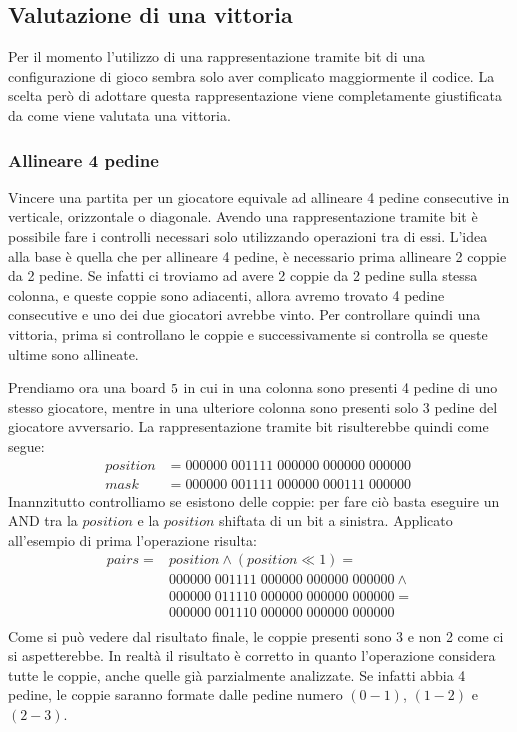 \documentclass[a4paper]{article}
\begin{document}
\subsection{Valutazione di una vittoria}
Per il momento l'utilizzo di una rappresentazione tramite bit di una 
configurazione di gioco sembra solo aver complicato maggiormente il codice. 
La scelta però di adottare questa rappresentazione viene completamente 
giustificata da come viene valutata una vittoria.

\subsubsection{Allineare 4 pedine}
Vincere una partita per un giocatore equivale ad allineare 4 pedine consecutive
in verticale, orizzontale o diagonale. Avendo una rappresentazione tramite bit è
possibile fare i controlli necessari solo utilizzando operazioni tra di essi.
L'idea alla base è quella che per allineare 4 pedine, è necessario prima 
allineare 2 coppie da 2 pedine. Se infatti ci troviamo ad avere 2 coppie da 2
pedine sulla stessa colonna, e queste coppie sono adiacenti, allora avremo 
trovato 4 pedine consecutive e uno dei due giocatori avrebbe vinto. Per 
controllare quindi una vittoria, prima si controllano le coppie e 
successivamente si controlla se queste ultime sono allineate.

Prendiamo ora una board $5 \time 5$ in cui in una colonna sono presenti 4 pedine
di uno stesso giocatore, mentre in una ulteriore colonna sono presenti solo 3
pedine del giocatore avversario. La rappresentazione tramite bit risulterebbe 
quindi come segue:
\begin{align*}
  position &= 000000\; 001111\; 000000\; 000000\; 000000\\
  mask &= 000000\; 001111\; 000000\; 000111\; 000000\;
\end{align*}
Inannzitutto controlliamo se esistono delle coppie: per fare ciò basta eseguire
un AND tra la $position$ e la $position$ shiftata di un bit a sinistra. Applicato
all'esempio di prima l'operazione risulta:
\begin{align*}
  pairs = &position \land (position \ll 1) =\\
  &000000\; 001111\; 000000\; 000000\; 000000 \land \\
  &000000\; 011110\; 000000\; 000000\; 000000 = \\
  &000000\; 001110\; 000000\; 000000\; 000000\\
\end{align*}
Come si può vedere dal risultato finale, le coppie presenti sono 3 e non 2 come
ci si aspetterebbe. In realtà il risultato è corretto in quanto l'operazione
considera tutte le coppie, anche quelle già parzialmente analizzate. Se infatti
abbia 4 pedine, le coppie saranno formate dalle pedine numero $(0-1)$, $(1-2)$ e 
$(2-3)$.
\end{document}
